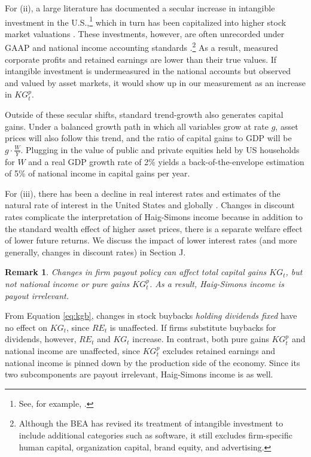 \documentclass[12pt]{article}
\newtheorem{remark}{Remark}
\begin{document}
For (ii), a large literature has documented a secular increase in intangible investment in the U.S.,\footnote{See, for example, \citep{crouzet2022economics,peters2017intangible}.} which in turn has been capitalized into higher stock market valuations \citep{hall2001stock,mcgrattan2010unmeasured}. These investments, however, are often unrecorded under GAAP and national income accounting standards \citep{lev2001intangibles,corrado2009intangible}.\footnote{Although the BEA has revised its treatment of intangible investment to include additional categories such as software, it still excludes firm-specific human capital, organization capital, brand equity, and advertising.} As a result, measured corporate profits and retained earnings are lower than their true values. If intangible investment is undermeasured in the national accounts but observed and valued by asset markets, it would show up in our measurement as an increase in $KG_t^p$. 

Outside of these secular shifts, standard trend-growth also generates capital gains. Under a balanced growth path in which all variables grow at rate $g$, asset prices will also follow this trend, and the ratio of capital gains to GDP will be $g \cdot \frac{W}{Y}$. Plugging in the value of public and private equities held by US households for $W$ and a real GDP growth rate of 2\% yields a back-of-the-envelope estimation of 5\% of national income in capital gains per year. 

For (iii), there has been a decline in real interest rates and estimates of the natural rate of interest in the United States \citep{eggertsson2019model,laubach2016measuring} and globally \citep{rachel2019secular}. Changes in discount rates complicate the interpretation of Haig-Simons income because in addition to the standard wealth effect of higher asset prices, there is a separate welfare effect of lower future returns. We discuss the impact of lower interest rates (and more generally, changes in discount rates) in Section J. 

\begin{remark} \label{remark:payout}  Changes in firm payout policy can affect total capital gains $KG_t$, but not national income or pure gains $KG^p_t$. As a result, Haig-Simons income is payout irrelevant. \end{remark} 
\noindent From Equation \ref{eq:kgb}, changes in stock buybacks \textit{holding dividends fixed} have no effect on $KG_t$, since $RE_t$ is unaffected. If firms substitute buybacks for dividends, however, $RE_t$ and $KG_t$ increase. In contrast, both pure gains $KG_t^p$ and national income are unaffected, since $KG_t^p$ excludes retained earnings and national income is pinned down by the production side of the economy. Since its two subcomponents are payout irrelevant, Haig-Simons income is as well. 
\end{document}
